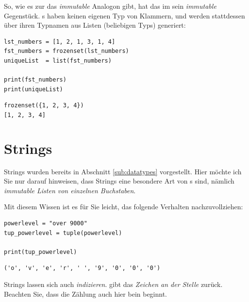 So, wie es zur  das \emph{immutable} Analogon  gibt, hat das  im  sein \emph{immutable} Gegenstück. s haben keinen eigenen Typ von Klammern, und werden stattdessen über ihren Typnamen aus Listen (beliebigen Typs) generiert:

\begin{codebox}
\begin{verbatim}
lst_numbers = [1, 2, 1, 3, 1, 4]
fst_numbers = frozenset(lst_numbers)
uniqueList  = list(fst_numbers)

print(fst_numbers)
print(uniqueList)
\end{verbatim}
\end{codebox}

\begin{cmdbox}[Ausgabe]
\begin{verbatim}
frozenset({1, 2, 3, 4})
[1, 2, 3, 4]
\end{verbatim}
\end{cmdbox}


\section{Strings}
Strings wurden bereits in Abschnitt \ref{sub:datatypes} vorgestellt. Hier möchte ich Sie nur darauf hinweisen, dass Strings eine besondere Art von s sind, nämlich \emph{immutable Listen von einzelnen Buchstaben}.

Mit diesem Wissen ist es für Sie leicht, das folgende Verhalten nachzuvollziehen:
\begin{codebox}
\begin{verbatim}
powerlevel = "over 9000"
tup_powerlevel = tuple(powerlevel)

print(tup_powerlevel)
\end{verbatim}
\end{codebox}

\begin{cmdbox}[Ausgabe]
\begin{verbatim}
('o', 'v', 'e', 'r', ' ', '9', '0', '0', '0')
\end{verbatim}
\end{cmdbox}

Strings lassen sich auch \emph{indizieren}.  gibt das \emph{Zeichen an der Stelle } zurück. Beachten Sie, dass die Zählung auch hier bein  beginnt.

